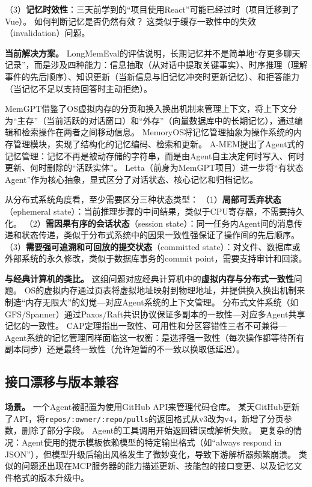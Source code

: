 （3）\textbf{记忆时效性}：三天前学到的``项目使用React''可能已经过时（项目迁移到了Vue）。
如何判断记忆是否仍然有效？
这类似于缓存一致性中的失效（invalidation）问题。

\textbf{当前解决方案。}
LongMemEval\cite{longmemeval2024}的评估说明，长期记忆并不是简单地``存更多聊天记录''，而是涉及四种能力：信息抽取（从对话中提取关键事实）、时序推理（理解事件的先后顺序）、知识更新（当新信息与旧记忆冲突时更新记忆）、和拒答能力（当记忆不足以支持回答时主动拒绝）。

MemGPT\cite{memgpt2023}借鉴了OS虚拟内存的分页和换入换出机制来管理上下文，将上下文分为``主存''（当前活跃的对话窗口）和``外存''（向量数据库中的长期记忆），通过编辑和检索操作在两者之间移动信息。
MemoryOS\cite{memoryos2025}将记忆管理抽象为操作系统的内存管理模块，实现了结构化的记忆编码、检索和更新。
A-MEM\cite{amem2025}提出了Agent式的记忆管理：记忆不再是被动存储的字符串，而是由Agent自主决定何时写入、何时更新、何时删除的``活跃实体''。
Letta\cite{letta_stateful_2026}（前身为MemGPT项目）进一步将``有状态Agent''作为核心抽象，显式区分了对话状态、核心记忆和归档记忆。

从分布式系统角度看，至少需要区分三种状态类型\cite{raft2014,spanner2012,cap2002}：
（1）\textbf{局部可丢弃状态}（ephemeral state）：当前推理步骤的中间结果，类似于CPU寄存器，不需要持久化。
（2）\textbf{需因果有序的会话状态}（session state）：同一任务内Agent间的消息传递和状态传递，类似于分布式系统中的因果一致性强保证了操作间的先后顺序\cite{raft2014}。
（3）\textbf{需要强可追溯和可回放的提交状态}（committed state）：对文件、数据库或外部系统的永久修改，类似于数据库事务的commit point，需要支持审计和回滚\cite{spanner2012}。

\textbf{与经典计算机的类比。}
这组问题对应经典计算机中的\textbf{虚拟内存与分布式一致性}问题。
OS的虚拟内存通过页表将虚拟地址映射到物理地址，并提供换入换出机制来制造``内存无限大''的幻觉---对应Agent系统的上下文管理。
分布式文件系统（如GFS/Spanner\cite{spanner2012}）通过Paxos/Raft\cite{raft2014}共识协议保证多副本的一致性---对应多Agent共享记忆的一致性。
CAP定理\cite{cap2002}指出一致性、可用性和分区容错性三者不可兼得---Agent系统的记忆管理同样面临这一权衡：是选择强一致性（每次操作都等待所有副本同步）还是最终一致性（允许短暂的不一致以换取低延迟）。

\subsection{接口漂移与版本兼容}

\textbf{场景。}
一个Agent被配置为使用GitHub API来管理代码仓库。
某天GitHub更新了API，将\texttt{repos/:owner/:repo/pulls}的返回格式从v3改为v4，新增了分页参数，删除了部分字段。
Agent的工具调用开始返回错误或解析失败。
更复杂的情况：Agent使用的提示模板依赖模型的特定输出格式（如``always respond in JSON''），但模型升级后输出风格发生了微妙变化，导致下游解析器频繁崩溃。
类似的问题还出现在MCP服务器的能力描述更新、技能包的接口变更、以及记忆文件格式的版本升级中。

